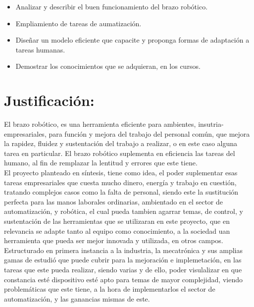 \documentclass[14pt,a4paper]{article}
\begin{document}
\begin{itemize}
\item Analizar y describir el buen funcionamiento del brazo robótico.
\item Empliamiento de tareas de aumatización.
\item Diseñar un modelo eficiente que capacite y proponga formas de adaptación a tareas humanas.
\item Demostrar los conocimientos que se adquieran, en los cursos. 
\end{itemize}

\section{Justificación:}

El brazo robótico, es una herramienta eficiente para ambientes, insutria-empresariales, para función y mejora del trabajo del personal común, que mejora la rapidez, fluidez y sustentación del trabajo a realizar, o en este caso alguna tarea en particular. El brazo robótico suplementa en eficiencia las tareas del humano, al fin de remplazar la lentitud y errores que este tiene.\\
El proyecto planteado en síntesis, tiene como idea, el  poder suplementar esas tareas empresariales que cuesta mucho dinero, energía y trabajo en cuestión, tratando complejos casos como la falta de personal, siendo este la sustitución perfecta para las manos laborales ordinarias, ambientado en el sector de automatización, y robótica, el cual pueda tambien agarrar temas, de control, y sustentación de las herramientas que se utilizaran en este proyecto, que en relevancia se adapte tanto al equipo como conocimiento, a la sociedad uan herramienta que pueda ser mejor innovada y utilizada, en otros campos.\\
Estructurado en primera instancia a la industria, la mecatrónica y sus amplias gamas de estudió que puede cubrir para la mejoración e implemetación, en las tareas que este pueda realizar, siendo varias y de ello, poder visulalizar en que constancia esté dispositivo esté apto para temas de mayor complejidad, viendo problemáticas que este tiene, a la  hora de implementarlos el sector de automatización, y las ganancias mismas de este.
\end{document}

